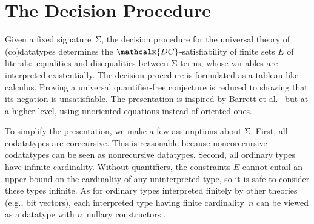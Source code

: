 \documentclass[smallcondensed,draft]{svjour3}
\newcommand\Sig{\mathrm{\Sigma}}
\newcommand{\Ec}{E}
\newcommand{\thD}{\mathcalx{DC}}
\newcommand\Types{\mathcalx{Y}}
\newcommand\Codata{\Types_{\mathrm{codt}}}
\begin{document}

\section{The Decision Procedure} %
\label{sec:the-decision-procedure}

Given a fixed signature~$\Sig$,
the decision procedure for the universal theory of (co)data\-types %
determines the
$\thD$-satisfiability of finite sets $\Ec$ of literals:\ equalities
and disequalities between $\Sig$-terms,
whose variables are interpreted existentially.
The decision procedure is formulated as a tableau-like calculus.
Proving a universal quantifier-free conjecture is reduced to showing that
its negation is unsatisfiable. The presentation is
inspired by Barrett et al.\ \cite{barrett-et-al-2007} but at
a higher level, using unoriented equations instead of oriented ones.

To simplify the presentation, we make a few assumptions about
$\Sig$.
First, all codatatypes %
are corecursive. This is reasonable
because noncorecursive codatatypes can be seen as nonrecursive
datatypes.
Second, all ordinary types have infinite cardinality.
Without quantifiers, the constraints $\Ec$ cannot entail an upper
bound on the cardinality of any uninterpreted type, so it is safe to consider these types
infinite. As for ordinary types interpreted finitely by other theories (e.g.,
bit vectors), each interpreted type having finite cardinality~$n$
can be viewed as a %
datatype with $n$~nullary constructors
\cite{barrett-et-al-2007}.

\end{document}
